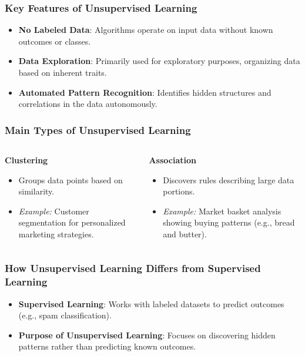 \documentclass[aspectratio=169]{beamer}
\begin{document}
\begin{frame}[fragile]
    \frametitle{Key Features of Unsupervised Learning}
    \begin{itemize}
        \item \textbf{No Labeled Data}: Algorithms operate on input data without known outcomes or classes.
        \item \textbf{Data Exploration}: Primarily used for exploratory purposes, organizing data based on inherent traits.
        \item \textbf{Automated Pattern Recognition}: Identifies hidden structures and correlations in the data autonomously.
    \end{itemize}
\end{frame}

\begin{frame}[fragile]
    \frametitle{Main Types of Unsupervised Learning}
    \begin{columns}
        \begin{column}{0.5\textwidth}
            \textbf{Clustering}
            \begin{itemize}
                \item Groups data points based on similarity.
                \item \textit{Example:} Customer segmentation for personalized marketing strategies.
            \end{itemize}
        \end{column}
        \begin{column}{0.5\textwidth}
            \textbf{Association}
            \begin{itemize}
                \item Discovers rules describing large data portions.
                \item \textit{Example:} Market basket analysis showing buying patterns (e.g., bread and butter).
            \end{itemize}
        \end{column}
    \end{columns}
\end{frame}

\begin{frame}[fragile]
    \frametitle{How Unsupervised Learning Differs from Supervised Learning}
    \begin{itemize}
        \item \textbf{Supervised Learning}: Works with labeled datasets to predict outcomes (e.g., spam classification).
        \item \textbf{Purpose of Unsupervised Learning}: Focuses on discovering hidden patterns rather than predicting known outcomes.
    \end{itemize}
\end{frame}
\end{document}
